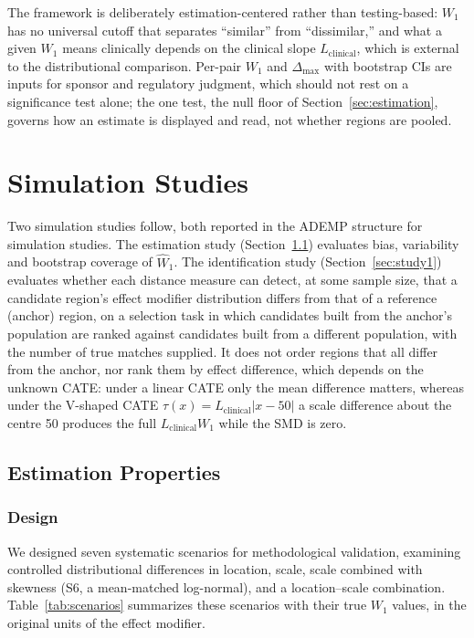 \documentclass[AMA,Times1COL]{WileyNJDv5}
\begin{document}
The framework is deliberately estimation-centered rather than testing-based: $W_1$ has no universal cutoff that separates ``similar'' from ``dissimilar,'' and what a given $W_1$ means clinically depends on the clinical slope $L_{\text{clinical}}$, which is external to the distributional comparison. Per-pair $W_1$ and $\Delta_{\max}$ with bootstrap CIs are inputs for sponsor and regulatory judgment, which should not rest on a significance test alone;\cite{wasserstein2016} the one test, the null floor of Section~\ref{sec:estimation}, governs how an estimate is displayed and read, not whether regions are pooled.

\section{Simulation Studies}\label{sec:simulation}

Two simulation studies follow, both reported in the ADEMP structure for simulation studies.\cite{morris2019} The estimation study (Section~\ref{sec:study2}) evaluates bias, variability and bootstrap coverage of $\widehat{W}_1$. The identification study (Section~\ref{sec:study1}) evaluates whether each distance measure can detect, at some sample size, that a candidate region's effect modifier distribution differs from that of a reference (anchor) region, on a selection task in which candidates built from the anchor's population are ranked against candidates built from a different population, with the number of true matches supplied. It does not order regions that all differ from the anchor, nor rank them by effect difference, which depends on the unknown CATE: under a linear CATE only the mean difference matters, whereas under the V-shaped CATE $\tau(x) = L_{\text{clinical}} |x - 50|$ a scale difference about the centre 50 produces the full $L_{\text{clinical}} W_1$ while the SMD is zero.


\subsection{Estimation Properties}\label{sec:study2}


\subsubsection{Design}\label{sec:sim_design}

We designed seven systematic scenarios for methodological validation, examining controlled distributional differences in location, scale, scale combined with skewness (S6, a mean-matched log-normal), and a location--scale combination. Table~\ref{tab:scenarios} summarizes these scenarios with their true $W_1$ values, in the original units of the effect modifier.
\end{document}
